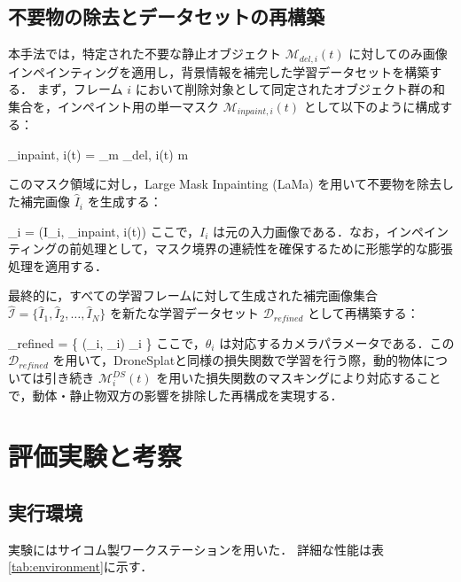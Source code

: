 \documentclass[a4paper,dvipdfmx,ja=standard,9pt]{bxjsarticle}
\let\oldequation\equation
\let\endoldequation\endequation
\renewenvironment{equation}{%
  \oldequation
  \Large  %
}{%
  \endoldequation
}
\begin{document}
\subsection{不要物の除去とデータセットの再構築}
本手法では，特定された不要な静止オブジェクト $\mathcal{M}_{del, i}(t)$ に対してのみ画像インペインティングを適用し，背景情報を補完した学習データセットを構築する．
まず，フレーム $i$ において削除対象として同定されたオブジェクト群の和集合を，インペイント用の単一マスク $\mathcal{M}_{inpaint, i}(t)$ として以下のように構成する：
\begin{equation}
_{inpaint, i}(t) = \bigcup_{m \in {}_{del, i}(t)} m
\end{equation}
\vspace{-9pt}

このマスク領域に対し，Large Mask Inpainting (LaMa)\cite{suvorov2021resolution} を用いて不要物を除去した補完画像 $\hat{I}_i$ を生成する：
\begin{equation}
_i = (I_i, _{inpaint, i}(t))
\end{equation}
\vspace{-9pt}
ここで，$I_i$ は元の入力画像である．なお，インペインティングの前処理として，マスク境界の連続性を確保するために形態学的な膨張処理を適用する．

最終的に，すべての学習フレームに対して生成された補完画像集合 $\hat{\mathcal{I}} = \{ \hat{I}_1, \hat{I}_2, \ldots, \hat{I}_N \}$ を新たな学習データセット $\mathcal{D}_{refined}$ として再構築する：
\begin{equation}
_{refined} = \{ (_i, \theta_i) \mid {}_i \in {} \}
\end{equation}
\vspace{-9pt}
ここで，$\theta_i$ は対応するカメラパラメータである．この $\mathcal{D}_{refined}$ を用いて，DroneSplatと同様の損失関数で学習を行う際，動的物体については引き続き $\mathcal{M}_i^{DS}(t)$ を用いた損失関数のマスキングにより対応することで，動体・静止物双方の影響を排除した再構成を実現する．


\newpage
\section{評価実験と考察}
\subsection{実行環境}
実験にはサイコム製ワークステーションを用いた．
詳細な性能は表\ref{tab:environment}に示す．
\end{document}
